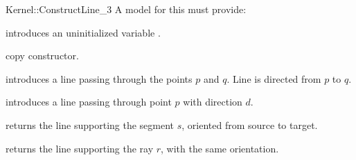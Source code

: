 \begin{ccRefFunctionObjectConcept}{Kernel::ConstructLine_3}
A model for this must provide:


\ccHidden {}
             {introduces an uninitialized variable .}

\ccHidden {}
 	    {copy constructor.}

            {introduces a line  passing through the points $p$ and $q$. 
             Line  is directed from $p$ to $q$.}


            {introduces a line  passing through point $p$ with 
             direction $d$.}

            {returns the line supporting the segment $s$,
	    oriented from source to target.}

            {returns the line supporting the ray $r$, with the
	    same orientation.}

\ccSeeAlso
{}  \\

\end{ccRefFunctionObjectConcept}
